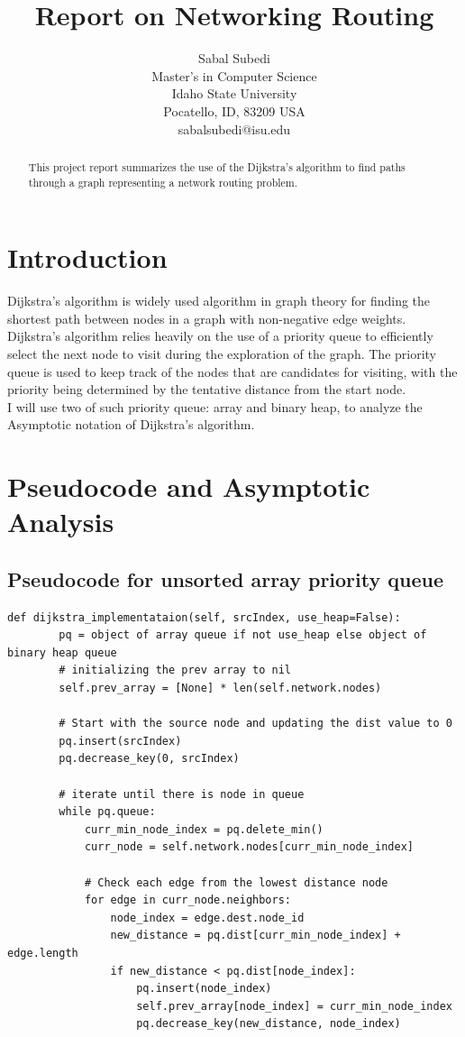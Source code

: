 \documentclass[12pt]{article}
\title{Report on Networking Routing}
\author{Sabal Subedi \\
Master's in Computer Science\\
Idaho State University\\
Pocatello, ID, 83209  USA\\
sabalsubedi@isu.edu\\
}
\begin{document}
\maketitle

\begin{abstract}
This project report summarizes the use of the  Dijkstra’s algorithm to find paths through a graph representing a network routing problem.
\end{abstract}
    
\section{Introduction}
Dijkstra's algorithm is widely used algorithm in graph theory for finding the shortest path between nodes in a graph with non-negative edge weights.\\
Dijkstra's algorithm relies heavily on the use of a priority queue to efficiently select the next node to visit during the exploration of the graph. The priority queue is used to keep track of the nodes that are candidates for visiting, with the priority being determined by the tentative distance from the start node. \\
I will use two of such priority queue: array and binary heap, to analyze the Asymptotic notation of Dijkstra’s algorithm.

\newpage
\section{Pseudocode and Asymptotic Analysis}

\subsection{Pseudocode for unsorted array priority queue}
\begin{lstlisting}[style=mystyle]
    def dijkstra_implementataion(self, srcIndex, use_heap=False):
        pq = object of array queue if not use_heap else object of binary heap queue
        # initializing the prev array to nil
        self.prev_array = [None] * len(self.network.nodes)

        # Start with the source node and updating the dist value to 0
        pq.insert(srcIndex)
        pq.decrease_key(0, srcIndex)

        # iterate until there is node in queue
        while pq.queue:
            curr_min_node_index = pq.delete_min()
            curr_node = self.network.nodes[curr_min_node_index]

            # Check each edge from the lowest distance node
            for edge in curr_node.neighbors:
                node_index = edge.dest.node_id
                new_distance = pq.dist[curr_min_node_index] + edge.length
                if new_distance < pq.dist[node_index]:
                    pq.insert(node_index)
                    self.prev_array[node_index] = curr_min_node_index
                    pq.decrease_key(new_distance, node_index)
    \end{lstlisting}
\end{document}
